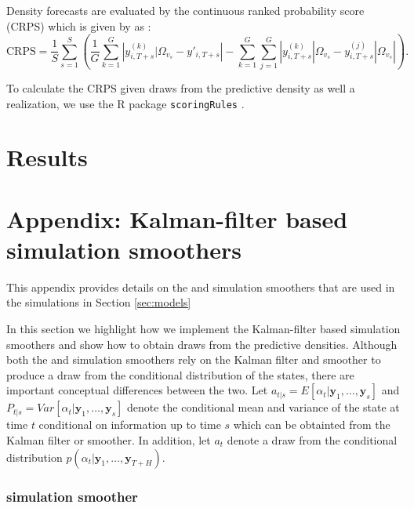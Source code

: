 \documentclass[notitlepage,a4paper,12pt]{article}
\begin{document}
Density forecasts are evaluated by the continuous ranked probability score (CRPS) which is given by as \citep[see][]{Gneitingetal2016}:
\begin{equation*}
\text{CRPS} = \frac{1}{S} \sum_{s=1}^{S} \left( \frac{1}{G} \sum_{k=1}^G \left\lvert {y}^{(k)}_{i,T+s}|\Omega_{v_{s}} - y'_{i, T+s} \right\rvert - \sum_{k=1}^G \sum_{j=1}^G \left\lvert {y}^{(k)}_{i,T+s}|\Omega_{v_{s}} - {y}^{(j)}_{i,T+s}|\Omega_{v_{s}} \right\rvert \right).
\end{equation*}

To calculate the CRPS given draws from the predictive density as well a realization, we use the R package \texttt{scoringRules} \citep{jkl_2019_jss}.

\section{Results}





\appendix

\section{Appendix: Kalman-filter based simulation smoothers}\label{app:kalmansimsmoothers}

This appendix provides details on the \citet{carterkohn1994_biomtr} and \citet{durbinkoopman2002_biomtr} simulation smoothers that are used in the simulations in Section \ref{sec:models}



In this section we highlight how we implement the Kalman-filter based simulation smoothers and show how to obtain draws from the predictive densities. Although both the \citet{carterkohn1994_biomtr} and \citet{durbinkoopman2002_biomtr} simulation smoothers rely on the Kalman filter and smoother to produce a draw from the conditional distribution of the states, there are important conceptual differences between the two. Let $a_{t|s} = E[\alpha_t|\mathbf{y}_1, \dots, \mathbf{y}_s]$ and $P_{t|s} = Var[\alpha_t|\mathbf{y}_1, \dots, \mathbf{y}_s]$ denote the conditional mean and variance of the state at time $t$ conditional on information up to time $s$ which can be obtainted from the Kalman filter or smoother. In addition, let $a_t$ denote a draw from the conditional distribution $p(\alpha_t | \mathbf{y}_1, \dots, \mathbf{y}_{T+H})$. 

\subsubsection{\citet{carterkohn1994_biomtr} simulation smoother}
\end{document}
